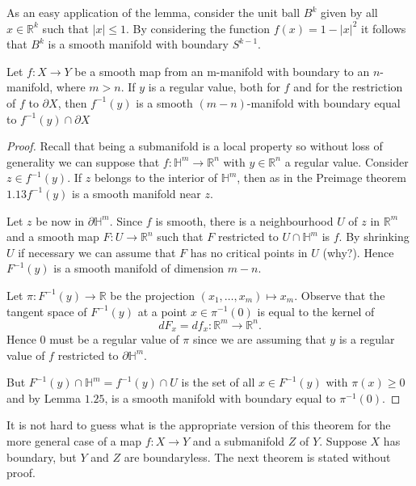 \documentclass[a4paper, 10pt, twocolumn]{amsart}
\begin{document}
As an easy application of the lemma, consider the unit ball $B^{k}$ given by all $x \in \mathbb{R}^{k}$ such that $|x| \leq 1$. By considering the function $f(x)=1-|x|^{2}$ it follows that $B^{k}$ is a smooth manifold with boundary $S^{k-1}$.

\begin{theorem}
    Let $f: X \rightarrow Y$ be a smooth map from an m-manifold with boundary to an $n$-manifold, where $m>n$. If $y$ is a regular value, both for $f$ and for the restriction of $f$ to $\partial X$, then $f^{-1}(y)$ is a smooth $(m-n)$-manifold with boundary equal to $f^{-1}(y) \cap \partial X$
\end{theorem}
\begin{proof}
    Recall that being a submanifold is a local property so without loss of generality we can suppose that $f: \mathbb{H}^{m} \rightarrow \mathbb{R}^{n}$ with $y \in \mathbb{R}^{n}$ a regular value. Consider $z \in f^{-1}(y)$. If $z$ belongs to the interior of $\mathbb{H}^{m}$, then as in the Preimage theorem $1.13 f^{-1}(y)$ is a smooth manifold near $z$.

Let $z$ be now in $\partial \mathbb{H}^{m}$. Since $f$ is smooth, there is a neighbourhood $U$ of $z$ in $\mathbb{R}^{m}$ and a smooth map $F: U \rightarrow \mathbb{R}^{n}$ such that $F$ restricted to $U \cap \mathbb{H}^{m}$ is $f$. By shrinking $U$ if necessary we can assume that $F$ has no critical points in $U$ (why?). Hence $F^{-1}(y)$ is a smooth manifold of dimension $m-n$.

Let $\pi: F^{-1}(y) \rightarrow \mathbb{R}$ be the projection $\left(x_{1}, \ldots, x_{m}\right) \mapsto x_{m}$. Observe that the tangent space of $F^{-1}(y)$ at a point $x \in \pi^{-1}(0)$ is equal to the kernel of
$$
d F_{x}=d f_{x}: \mathbb{R}^{m} \rightarrow \mathbb{R}^{n}.
$$
Hence 0 must be a regular value of $\pi$ since we are assuming that $y$ is a regular value of $f$ restricted to $\partial \mathbb{H}^{m}$.

But $F^{-1}(y) \cap \mathbb{H}^{m}=f^{-1}(y) \cap U$ is the set of all $x \in F^{-1}(y)$ with $\pi(x) \geq 0$ and by Lemma $1.25$, is a smooth manifold with boundary equal to $\pi^{-1}(0)$.
\end{proof}

It is not hard to guess what is the appropriate version of this theorem for the more general case of a map $f: X \rightarrow Y$ and a submanifold $Z$ of $Y$. Suppose $X$ has boundary, but $Y$ and $Z$ are boundaryless. The next theorem is stated without proof.
\end{document}
